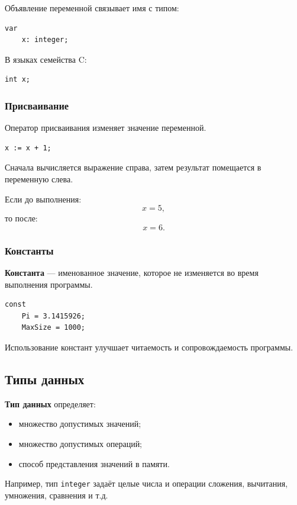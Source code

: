 \documentclass[12pt,a4paper]{article}
\begin{document}
Объявление переменной связывает имя с типом:

\begin{verbatim}
var
    x: integer;
\end{verbatim}

В языках семейства C:

\begin{verbatim}
int x;
\end{verbatim}

\subsubsection{Присваивание}

Оператор присваивания изменяет значение переменной.

\begin{verbatim}
x := x + 1;
\end{verbatim}

Сначала вычисляется выражение справа, затем результат помещается в переменную слева.

Если до выполнения:
\[
    x = 5,
\]
то после:
\[
    x = 6.
\]

\subsubsection{Константы}

\textbf{Константа} --- именованное значение, которое не изменяется во время выполнения программы.

\begin{verbatim}
const
    Pi = 3.1415926;
    MaxSize = 1000;
\end{verbatim}

Использование констант улучшает читаемость и сопровождаемость программы.

\subsection{Типы данных}

\textbf{Тип данных} определяет:
\begin{itemize}
    \item множество допустимых значений;
    \item множество допустимых операций;
    \item способ представления значений в памяти.
\end{itemize}

Например, тип \texttt{integer} задаёт целые числа и операции сложения, вычитания, умножения, сравнения и т.д.
\end{document}
